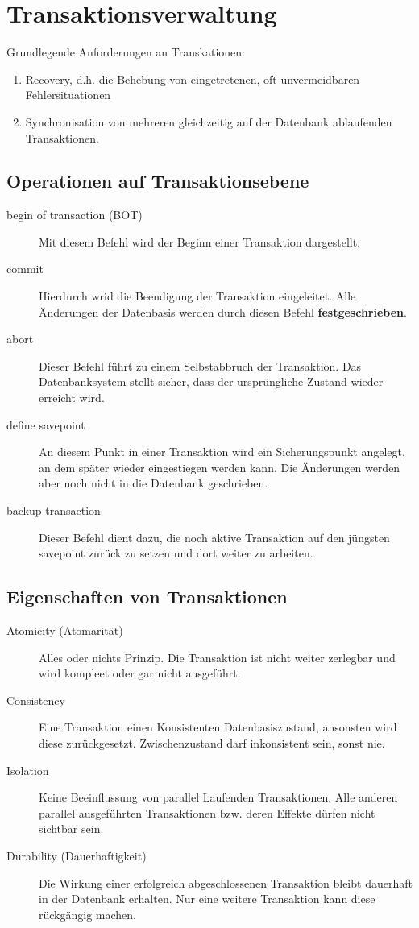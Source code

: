 \chapter{Transaktionsverwaltung}
Grundlegende Anforderungen an Transkationen:
\begin{enumerate}
\item Recovery, d.h. die Behebung von eingetretenen, oft unvermeidbaren Fehlersituationen
\item Synchronisation von mehreren gleichzeitig auf der Datenbank ablaufenden Transaktionen. 
\end{enumerate}
\section{Operationen auf Transaktionsebene}
\begin{description}
\item[begin of transaction (BOT)] Mit diesem Befehl wird der Beginn einer Transaktion dargestellt.
\item[commit] Hierdurch wrid die Beendigung der Transaktion eingeleitet. Alle Änderungen der Datenbasis werden durch diesen Befehl \textbf{festgeschrieben}.
\item[abort] Dieser Befehl führt zu einem Selbstabbruch der Transaktion. Das Datenbanksystem stellt sicher, dass der ursprüngliche Zustand wieder erreicht wird. 
\item[define savepoint] An diesem Punkt in einer Transaktion wird ein Sicherungspunkt angelegt, an dem später wieder eingestiegen werden kann. Die Änderungen werden aber noch nicht in die Datenbank geschrieben. 
\item[backup transaction] Dieser Befehl dient dazu, die noch aktive Transaktion auf den jüngsten savepoint zurück zu setzen und dort weiter zu arbeiten.
\end{description}
\section{Eigenschaften von Transaktionen}
\begin{description}
\item[Atomicity (Atomarität)] Alles oder nichts Prinzip. Die Transaktion ist nicht weiter zerlegbar und wird kompleet oder gar nicht ausgeführt.
\item[Consistency] Eine Transaktion einen Konsistenten Datenbasiszustand, ansonsten wird diese zurückgesetzt. Zwischenzustand darf inkonsistent sein, sonst nie. 
\item[Isolation] Keine Beeinflussung von parallel Laufenden Transaktionen. Alle anderen parallel ausgeführten Transaktionen bzw. deren Effekte dürfen nicht sichtbar sein.
\item[Durability (Dauerhaftigkeit)] Die Wirkung einer erfolgreich abgeschlossenen Transaktion bleibt dauerhaft in der Datenbank erhalten. Nur eine weitere Transaktion kann diese rückgängig machen. 
\end{description}
